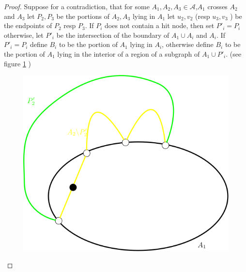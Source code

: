 \documentclass[letterpaper,11pt]{article}
\newcommand{\0}{\mathbb{0}}
\newcommand{\1}{\mathbb{1}}
\begin{document}
\begin{proof}
 Suppose for a contradiction, that for some $A_1, A_2 ,A_3 \in \mathcal{A}$,$A_1$ crosses $A_2 $ and $A_3$ let $P_2 , P_3$ be the portions of $A_2, A_3$ lying in $A_1$ let $u_2, v_2$ (resp    $u_3, v_3$ ) be the endpoints of $P_2$ resp $P_3$. 
If $P_i$ does not contain a hit node, then set $P'_i=P_i$ otherwise, let $P'_i$ be the intersection of the boundary of $A_1 \cup A_i$ and $A_i$. If $P'_i = P_i$ define $B_i$ to be the portion of $A_1$ lying in $A_i$, otherwise define $B_i$ to be the portion of $A_1$ lying in the interior of a region of a subgraph of $ A_1 \cup P'_i$. (see figure \ref{P'def} ) 
\begin{figure}
        \includegraphics[scale=0.3]{P'def.png}
    \label{P'def}
\end{figure}



\end{proof}
\end{document}
